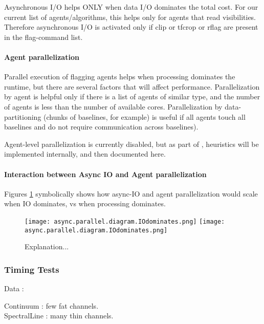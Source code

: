 Asynchronous I/O helps ONLY when data I/O dominates the total cost. 
For our current list of agents/algorithms, this helps only for agents that read 
visibilities. Therefore asynchronous I/O is activated only if clip or tfcrop or rflag 
are present in the flag-command list.


\paragraph{Agent parallelization}

Parallel execution of flagging agents helps when processing dominates the runtime, but there
are several factors that will affect performance. 
Parallelization by agent is helpful only if there is a list of agents of similar type, and the number of
agents is less than the number of available cores.  Parallelization by data-partitioning (chunks of
baselines, for example) is useful if all agents touch all baselines and do not require communication
across baselines).

Agent-level parallelization is currently disabled, but as part of , heuristics will be implemented internally, and then documented here.



\paragraph{Interaction between Async IO and Agent parallelization}

Figures \ref{Fig:AsyncDiags} symbolically shows how async-IO and agent parallelization would scale
when IO dominates, vs when processing dominates.

\begin{figure}
\texttt{[image: async.parallel.diagram.IOdominates.png]}
\texttt{[image: async.parallel.diagram.IOdominates.png]}
\caption{Explanation...}
\label{Fig:AsyncDiags}
\end{figure}






\subsubsection{Timing Tests}

Data : 

Continuum : few fat channels.\\
SpectralLine : many thin channels.\\

